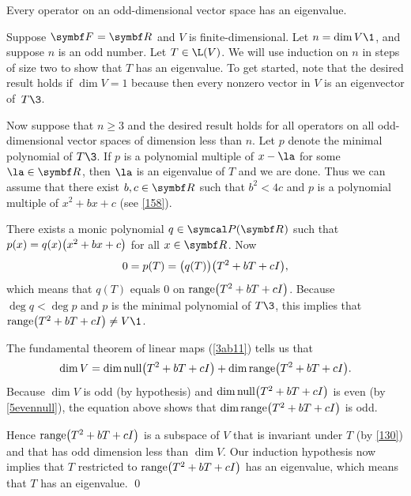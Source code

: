{Every operator on an odd-dimensional vector space has an eigenvalue.}

\proof
Suppose $\F{} = \R{}$ and $V$ is finite-dimensional. Let $n = \dim V\1$, and suppose $n$ is an odd number. Let $T \in \L(V)$. We will use induction on $n$ in steps of size two to show that $T$ has an eigenvalue. To get started, note that the desired result holds if $\dim V = 1$ because then every nonzero vector in $V$ is an eigenvector of~$T\3$.

Now suppose that $n \ge 3$ and the desired result holds for all operators on all odd-dimensional vector spaces of dimension less than $n$. Let $p$ denote the minimal polynomial of $T\3$. If $p$ is a polynomial multiple of $x-\la$ for some $\la \in \R{}$, then $\la$ is an eigenvalue of $T$  and we are done. Thus we can assume that there exist $b, c \in \R{}$ such that $b^2 < 4c$ and $p$ is a polynomial multiple of $x^2 + bx + c$ (see \ref{158}).

There exists a monic polynomial $q \in \P(\R{})$ such that $p(x) = q(x) \paren[\big]{x^2 + bx + c}$ for all $x \in \R{}$. Now
\[
0 = p(T) = \paren[\big]{q(T)}\paren[\big]{T^2 + b T + cI},
\]
which means that $q(T)$ equals $0$ on $\ran\paren[\big]{T^2 + bT + cI}$. Because $\deg q < \deg p$ and $p$ is the minimal polynomial of $T\3$, this implies that $\ran\paren[\big]{T^2 + bT + cI} \ne V\1$.

The fundamental theorem of linear maps (\ref{3ab11}) tells us that
\[
\dim V = \dim \ker\paren[\big]{T^2 + bT + cI} + \dim \ran\paren[\big]{T^2 + bT + cI}.
\]
Because $\dim V$ is odd (by hypothesis) and $\dim \ker\paren[\big]{T^2 + bT + cI}$ is even (by \ref{5evennull}), the equation above shows that
$\dim \ran\paren[\big]{T^2 + bT + cI}$ is odd.

Hence $\ran\paren[\big]{T^2 + bT + cI}$ is a subspace of $V$ that is invariant under $T$ (by \ref{130}) and that has odd dimension less than
$\dim V$. Our induction hypothesis now implies that $T$ restricted to $\ran\paren[\big]{T^2 + bT + cI}$ has an eigenvalue, which means that $T$ has an eigenvalue.
\qed

